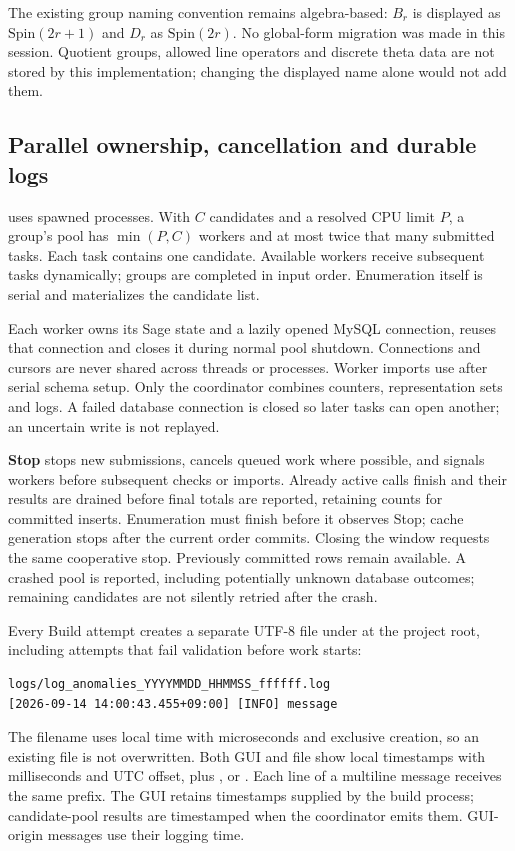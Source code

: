 The existing group naming convention remains algebra-based:
$B_r$ is displayed as $\mathrm{Spin}(2r+1)$ and $D_r$ as
$\mathrm{Spin}(2r)$. No global-form migration was made in this session.
Quotient groups, allowed line operators and discrete theta data are not stored
by this implementation; changing the displayed name alone would not add them.

\clearpage
\subsection{Parallel ownership, cancellation and durable logs}
 uses spawned processes. With $C$ candidates
and a resolved CPU limit $P$, a group's pool has $\min(P,C)$ workers and at most
twice that many submitted tasks. Each task contains one candidate. Available
workers receive subsequent tasks dynamically; groups are completed in input
order. Enumeration itself is serial and materializes the candidate list.

Each worker owns its Sage state and a lazily opened MySQL connection, reuses
that connection and closes it during normal pool shutdown. Connections and
cursors are never shared across threads or processes. Worker imports use
 after serial schema setup. Only the coordinator
combines counters, representation sets and logs. A failed database connection
is closed so later tasks can open another; an uncertain write is not replayed.

\textbf{Stop} stops new submissions, cancels queued work where possible, and
signals workers before subsequent checks or imports. Already active calls
finish and their results are drained before final totals are reported, retaining
counts for committed inserts. Enumeration must finish before it observes Stop;
cache generation stops after the current order commits. Closing the window
requests the same cooperative stop. Previously committed rows remain available.
A crashed pool is reported, including potentially unknown database outcomes;
remaining candidates are not silently retried after the crash.

Every Build attempt creates a separate UTF-8 file under  at the
project root, including attempts that fail validation before work starts:
\begin{lstlisting}
logs/log_anomalies_YYYYMMDD_HHMMSS_ffffff.log
[2026-09-14 14:00:43.455+09:00] [INFO] message
\end{lstlisting}
The filename uses local time with microseconds and exclusive creation, so an
existing file is not overwritten. Both GUI and file show local timestamps with
milliseconds and UTC offset, plus ,  or .
Each line of a multiline message receives the same prefix. The GUI retains
timestamps supplied by the build process; candidate-pool results are timestamped
when the coordinator emits them. GUI-origin messages use their logging time.

